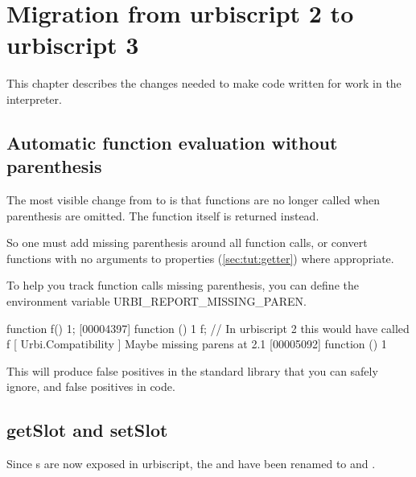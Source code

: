 
\chapter{Migration from urbiscript 2 to urbiscript 3}

This chapter describes the changes needed to make \us code written for
 work in the  interpreter.

\section{Automatic function evaluation without parenthesis}

The most visible change from  to  is that functions are no
longer called when parenthesis are omitted. The function itself is
returned instead.

So one must add missing parenthesis around all function calls, or convert
functions with no arguments to properties (\ref{sec:tut:getter}) where
appropriate.

To help you track function calls missing parenthesis, you can define
the environment variable URBI\_REPORT\_MISSING\_PAREN.

\begin{urbiunchecked}
function f() {1};
[00004397] function () { 1 }
f; // In urbiscript 2 this would have called f
[  Urbi.Compatibility   ] Maybe missing parens at 2.1
[00005092] function () { 1 }
\end{urbiunchecked}

This will produce false positives in the \us standard library that you can
safely ignore, and false positives in  code.

\section{getSlot and setSlot}

Since s are now exposed in urbiscript, the 
 and  have been renamed to
 and .

